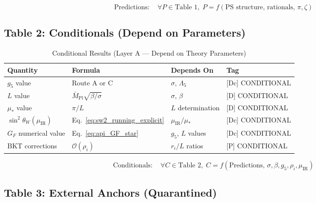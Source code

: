 \documentclass[11pt,a4paper]{article}
\theoremstyle{definition}
\begin{document}
\begin{equation}
\label{eq:predictions_summary}
\text{Predictions}: \quad \forall P \in \text{Table 1}, \; P = f(\text{PS structure, rationals, } \pi, \zeta)
\end{equation}

\subsection{Table 2: Conditionals (Depend on Parameters)}
\label{subsec:table_conditionals}

\begin{table}[h]
\centering
\caption{Conditional Results (Layer A --- Depend on Theory Parameters)}
\label{tab:conditionals}
\begin{tabular}{@{}llll@{}}
\toprule
\textbf{Quantity} & \textbf{Formula} & \textbf{Depends On} & \textbf{Tag} \\
\midrule
$g_5$ value & Route A or C & $\sigma$, $\Lambda_5$ & [Dc] CONDITIONAL \\
$L$ value & $\bar{M}_{\text{Pl}}\sqrt{\beta/\sigma}$ & $\sigma$, $\beta$ & [D] CONDITIONAL \\
$\mu_*$ value & $\pi/L$ & $L$ determination & [D] CONDITIONAL \\
$\sin^2\theta_W(\mu_{\text{IR}})$ & Eq.~\ref{eq:sw2_running_explicit} & $\mu_{\text{IR}}/\mu_*$ & [Dc] CONDITIONAL \\
$G_F$ numerical value & Eq.~\ref{eq:api_GF_star} & $g_5$, $L$ values & [Dc] CONDITIONAL \\
BKT corrections & $\mathcal{O}(\rho_i)$ & $r_i/L$ ratios & [P] CONDITIONAL \\
\bottomrule
\end{tabular}
\end{table}

\begin{equation}
\label{eq:conditionals_summary}
\text{Conditionals}: \quad \forall C \in \text{Table 2}, \; C = f(\text{Predictions, } \sigma, \beta, g_5, \rho_i, \mu_{\text{IR}})
\end{equation}

\subsection{Table 3: External Anchors (Quarantined)}
\label{subsec:table_external}
\end{document}
